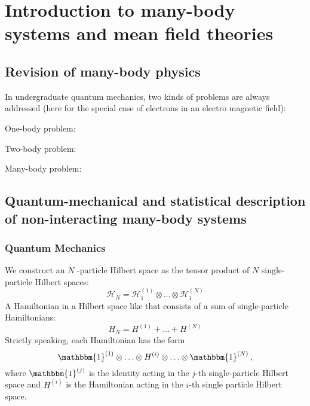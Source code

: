 \documentclass[../classnotes.tex]{subfiles}
\begin{document}
\chapter{Introduction to many-body systems and mean field theories}\label{ch:introduction-to-many-body-systems-and-mean-field-theories}

\section{Revision of many-body physics}\label{sec:revision-of-many-body-physics}

In undergraduate quantum mechanics, two kinds of problems are always addressed (here for the special case of electrons in an electro magnetic field):

One-body problem: 

Two-body problem:

Many-body problem:

\section{Quantum-mechanical and statistical description of non-interacting many-body systems}\label{sec:quantum-mechanical-and-statistical-description-of-non-interacting-systems}

\subsection{Quantum Mechanics}\label{subsec:quantum-mechanics}

We construct an \(N\) -particle Hilbert space as the tensor product of \(N\) single-particle Hilbert spaces:
\begin{equation}
    \mathcal{H}_N = \mathcal{H}_1^{(1)} \otimes \ldots \otimes \mathcal{H}_1^{(N)}
\end{equation}
A Hamiltonian in a Hilbert space like that consists of a sum of single-particle Hamiltonians:
\begin{equation}
    H_N = H^{(1)} + \ldots + H^{(N)}
\end{equation}
Strictly speaking, each Hamiltonian has the form
\begin{equation}
    \mathbbm{1}^{(1)} \otimes \ldots \otimes H^{(i)} \otimes \ldots \otimes \mathbbm{1}^{(N)} \,,
\end{equation}
where \(\mathbbm{1}^{(j)}\) is the identity acting in the \(j\)-th single-particle Hilbert space and \(H^{(i)}\) is the Hamiltonian acting in the \(i\)-th single particle Hilbert space.
\end{document}
